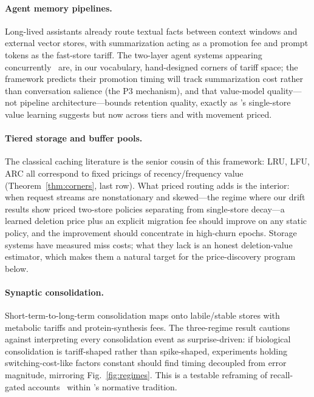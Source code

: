 \documentclass[10pt,twocolumn]{article}
\theoremstyle{definition}
\begin{document}
\paragraph{Agent memory pipelines.}
Long-lived assistants already route textual facts between context windows and external vector stores, with
summarization acting as a promotion fee and prompt tokens as the fast-store tariff. The two-layer agent
systems appearing concurrently~\citep{li2026duallayer} are, in our vocabulary, hand-designed corners of
tariff space; the framework predicts their promotion timing will track summarization cost rather than
conversation salience (the P3 mechanism), and that value-model quality---not pipeline architecture---bounds
retention quality, exactly as \citet{chen2026learning}'s single-store value learning suggests but now
across tiers and with movement priced.

\paragraph{Tiered storage and buffer pools.}
The classical caching literature is the senior cousin of this framework: {LRU}, {LFU}, {ARC} all correspond
to fixed pricings of recency/frequency value (Theorem~\ref{thm:corners}, last row). What priced routing adds
is the interior: when request streams are nonstationary and skewed---the regime where our drift results show
priced two-store policies separating from single-store decay---a learned deletion price plus an explicit
migration fee should improve on any static policy, and the improvement should concentrate in high-churn
epochs. Storage systems have measured miss costs; what they lack is an honest deletion-value estimator, which
makes them a natural target for the price-discovery program below.

\paragraph{Synaptic consolidation.}
Short-term-to-long-term consolidation maps onto labile/stable stores with metabolic tariffs and
protein-synthesis fees. The three-regime result cautions against interpreting every consolidation event as
surprise-driven: if biological consolidation is tariff-shaped rather than spike-shaped, experiments holding
switching-cost-like factors constant should find timing decoupled from error magnitude, mirroring
Fig.~\ref{fig:regimes}. This is a testable reframing of recall-gated accounts~\citep{gershman2025recallgated}
within \citet{anderson1991rational}'s normative tradition.
\end{document}
